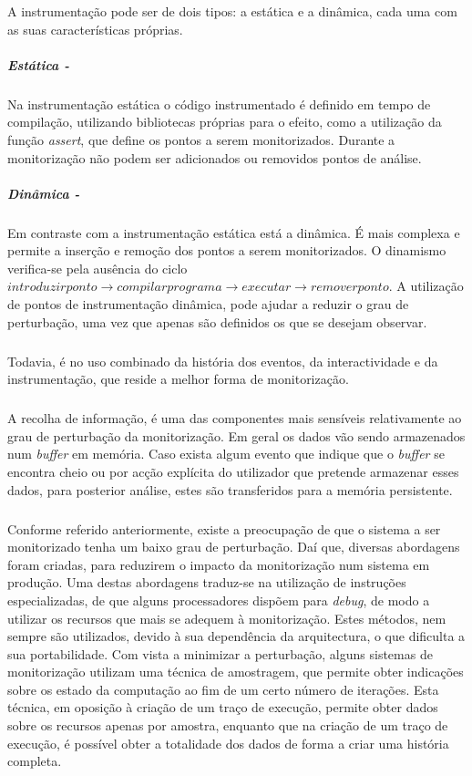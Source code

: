 \begin{itemize}
A instrumentação pode ser de dois tipos: a estática e a dinâmica, cada uma com as suas características próprias.

\subparagraph*{Estática - }

Na instrumentação estática o código instrumentado é definido em tempo de compilação, utilizando bibliotecas próprias para o efeito, como a utilização da função \textit{assert}, que define os pontos a serem monitorizados.
Durante a monitorização não podem ser adicionados ou removidos pontos de análise.

\subparagraph*{Dinâmica - }

Em contraste com a instrumentação estática está a dinâmica.
É mais complexa e permite a inserção e remoção dos pontos a serem monitorizados.
O dinamismo verifica-se pela ausência do ciclo $introduzir ponto\rightarrow compilar programa\rightarrow executar\rightarrow remover ponto$.
A utilização de pontos de instrumentação dinâmica, pode ajudar a reduzir o grau de perturbação, uma vez que apenas são definidos os que se desejam observar.
\end{itemize}

\subparagraph*{}
Todavia, é no uso combinado da história dos eventos, da interactividade e da instrumentação, que reside a melhor forma de monitorização.

\subparagraph*{
}
A recolha de informação, é uma das componentes mais sensíveis relativamente ao grau de perturbação da monitorização.
Em geral os dados vão sendo armazenados num \textit{buffer} em memória.
Caso exista algum evento que indique que o \textit{buffer} se encontra cheio ou por acção explícita do utilizador que pretende armazenar esses dados, para posterior análise, estes são transferidos para a memória persistente.

\subparagraph*{
}
Conforme referido anteriormente, existe a preocupação de que o sistema a ser monitorizado tenha um baixo grau de perturbação.
Daí que, diversas abordagens foram criadas, para reduzirem o impacto da monitorização num sistema em produção.
Uma destas abordagens traduz-se na utilização de instruções especializadas, de que alguns processadores dispõem para \textit{debug}, de modo a utilizar os recursos que mais se adequem à monitorização.
Estes métodos, nem sempre são utilizados, devido à sua dependência da arquitectura, o que dificulta a sua portabilidade.
Com vista a minimizar a perturbação, alguns sistemas de monitorização utilizam uma técnica de amostragem, que permite obter indicações sobre os estado da computação ao fim de um certo número de iterações.
Esta técnica, em oposição à criação de um traço de execução, permite obter dados sobre os recursos apenas por amostra, enquanto que na criação de um traço de execução, é possível obter a totalidade dos dados de forma a criar uma história completa.

